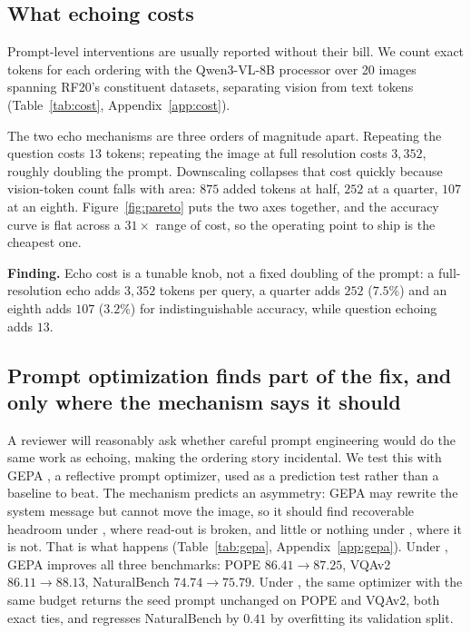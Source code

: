 \subsection{What echoing costs}
\label{sec:ablation-cost}

Prompt-level interventions are usually reported without their bill. We count
exact tokens for each ordering with the Qwen3-VL-8B processor over 20 images
spanning RF20's constituent datasets, separating vision from text tokens
(Table~\ref{tab:cost}, Appendix~\ref{app:cost}).

The two echo mechanisms are three orders of magnitude apart. Repeating the
question costs $13$ tokens; repeating the image at full resolution costs
$3{,}352$, roughly doubling the prompt. Downscaling collapses that cost quickly
because vision-token count falls with area: $875$ added tokens at half, $252$ at
a quarter, $107$ at an eighth. Figure~\ref{fig:pareto} puts the two axes
together, and the accuracy curve is flat across a $31\times$ range of cost, so
the operating point to ship is the cheapest one.

\begin{finding}
\textbf{Finding.} Echo cost is a tunable knob, not a fixed doubling of the
prompt: a full-resolution echo adds $3{,}352$ tokens per query, a quarter adds
$252$ ($7.5\%$) and an eighth adds $107$ ($3.2\%$) for indistinguishable
accuracy, while question echoing adds $13$.
\end{finding}

\subsection{Prompt optimization finds part of the fix, and only where the
mechanism says it should}
\label{sec:ablation-gepa}
\label{sec:gepa}

A reviewer will reasonably ask whether careful prompt engineering would do the
same work as echoing, making the ordering story incidental. We test this with
GEPA \citep{gepa2025}, a reflective prompt optimizer, used as a prediction test
rather than a baseline to beat. The mechanism predicts an asymmetry: GEPA may
rewrite the system message but cannot move the image, so it should find
recoverable headroom under \sti{}, where read-out is broken, and little or
nothing under \sit{}, where it is not. That is what happens (Table~\ref{tab:gepa}, Appendix~\ref{app:gepa}). Under \sti{}, GEPA
improves all three benchmarks: POPE $86.41 \to 87.25$, VQAv2 $86.11 \to 88.13$,
NaturalBench $74.74 \to 75.79$. Under \sit{}, the same optimizer with the same
budget returns the seed prompt unchanged on POPE and VQAv2, both exact ties, and
regresses NaturalBench by $0.41$ by overfitting its validation split.

